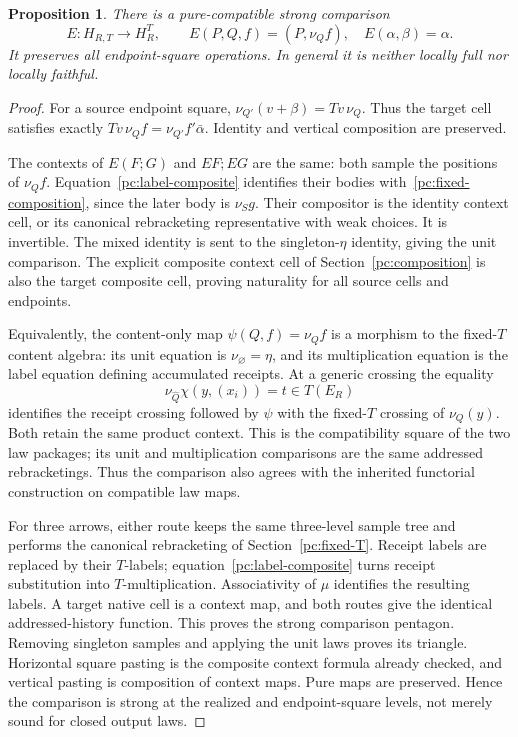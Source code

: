 \documentclass[11pt,a4paper]{article}
\newtheorem{proposition}[theorem]{Proposition}
\theoremstyle{definition}
\begin{document}
\begin{proposition}\label{pc:receipt-forgetting}
There is a pure-compatible strong comparison
\[
 E:H_{R,T}\longrightarrow H^T_R,\qquad
 E(P,Q,f)=(P,\nu_Qf),\quad E(\alpha,\beta)=\alpha.
\]
It preserves all endpoint-square operations. In general it is neither
locally full nor locally faithful.
\end{proposition}
\begin{proof}
For a source endpoint square,
$\nu_{Q'}(v+\beta)=Tv\,\nu_Q$. Thus the target cell satisfies exactly
$Tv\,\nu_Qf=\nu_{Q'}f'\bar\alpha$. Identity and vertical composition
are preserved.

The contexts of $E(F;G)$ and $EF;EG$ are the same: both sample the
positions of $\nu_Qf$. Equation~\eqref{pc:label-composite} identifies
their bodies with~\eqref{pc:fixed-composition}, since the later body is
$\nu_Sg$. Their compositor is the identity context cell, or its canonical
rebracketing representative with weak choices. It is invertible. The mixed
identity is sent to the singleton-$\eta$ identity, giving the unit comparison.
The explicit composite context cell of Section~\ref{pc:composition} is
also the target composite cell, proving naturality for all source cells
and endpoints.

Equivalently, the content-only map
$\psi(Q,f)=\nu_Qf$ is a morphism to the fixed-$T$ content algebra:
its unit equation is $\nu_{\varnothing}=\eta$, and its multiplication
equation is the label equation defining accumulated receipts. At a generic
crossing the equality
\[
 \nu_{\widehat Q}\chi(y,(x_i))=t\in T(E_R)
\]
identifies the receipt crossing followed by $\psi$ with the fixed-$T$
crossing of $\nu_Q(y)$. Both retain the same product context. This is the
compatibility square of the two law packages; its unit and multiplication
comparisons are the same addressed rebracketings. Thus the comparison also
agrees with the inherited functorial construction on compatible law maps.

For three arrows, either route keeps the same three-level sample tree and
performs the canonical rebracketing of Section~\ref{pc:fixed-T}. Receipt
labels are replaced by their $T$-labels; equation~\eqref{pc:label-composite}
turns receipt substitution into $T$-multiplication. Associativity of $\mu$
identifies the resulting labels. A target native cell is a context map,
and both routes give the identical addressed-history function. This proves
the strong comparison pentagon. Removing singleton samples and applying
the unit laws proves its triangle. Horizontal square pasting is the
composite context formula already checked, and vertical pasting is
composition of context maps. Pure maps are preserved. Hence the comparison
is strong at the realized and endpoint-square levels, not merely sound for
closed output laws.


\end{proof}
\end{document}

